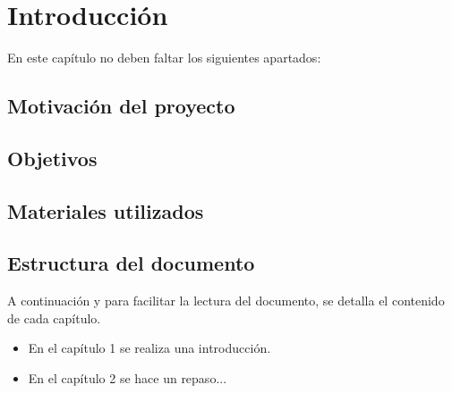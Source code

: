 \chapter{Introducción}

En este capítulo no deben faltar los siguientes apartados:

\section{Motivación del proyecto}



\section{Objetivos}



\section{Materiales utilizados}



\section{Estructura del documento}

A continuación y para facilitar la lectura del documento, se detalla el contenido de cada capítulo.

\begin{itemize}
\item En el capítulo 1 se realiza una introducción.
\item En el capítulo 2 se hace un repaso...
\end{itemize}
